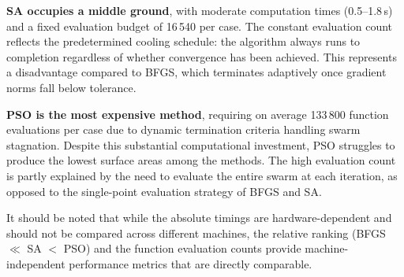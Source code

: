 \textbf{SA occupies a middle ground}, with moderate computation times (0.5--1.8\,s) and a fixed evaluation budget of 16\,540 per case. The constant evaluation count reflects the predetermined cooling schedule: the algorithm always runs to completion regardless of whether convergence has been achieved. This represents a disadvantage compared to BFGS, which terminates adaptively once gradient norms fall below tolerance.

\textbf{PSO is the most expensive method}, requiring on average 133\,800 function evaluations per case due to dynamic termination criteria handling swarm stagnation. Despite this substantial computational investment, PSO struggles to produce the lowest surface areas among the methods. The high evaluation count is partly explained by the need to evaluate the entire swarm at each iteration, as opposed to the single-point evaluation strategy of BFGS and SA.

It should be noted that while the absolute timings are hardware-dependent and should not be compared across different machines, the relative ranking (BFGS $\ll$ SA $<$ PSO) and the function evaluation counts provide machine-independent performance metrics that are directly comparable.